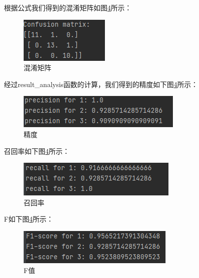 \documentclass[UTF8,a4paper,10pt]{ctexart}
\begin{document}
根据公式我们得到的混淆矩阵如图\ref{fig:1}所示：

\begin{figure}[H]
    \centering
    \includegraphics[scale=1]{2.png}
    \caption{混淆矩阵}
    \label{fig:1}
\end{figure}

经过result\_analysis函数的计算，我们得到的精度如下图\ref{fig:1}所示：

\begin{figure}[H]
    \centering
    \includegraphics[scale=1]{3.png}
    \caption{精度}
    \label{fig:1}
\end{figure}

召回率如下图\ref{fig:1}所示：

\begin{figure}[H]
    \centering
    \includegraphics[scale=1]{4.png}
    \caption{召回率}
    \label{fig:1}
\end{figure}

F如下图\ref{fig:1}所示：

\begin{figure}[H]
    \centering
    \includegraphics[scale=1]{5.png}
    \caption{F值}
    \label{fig:1}
\end{figure}



\end{document}
